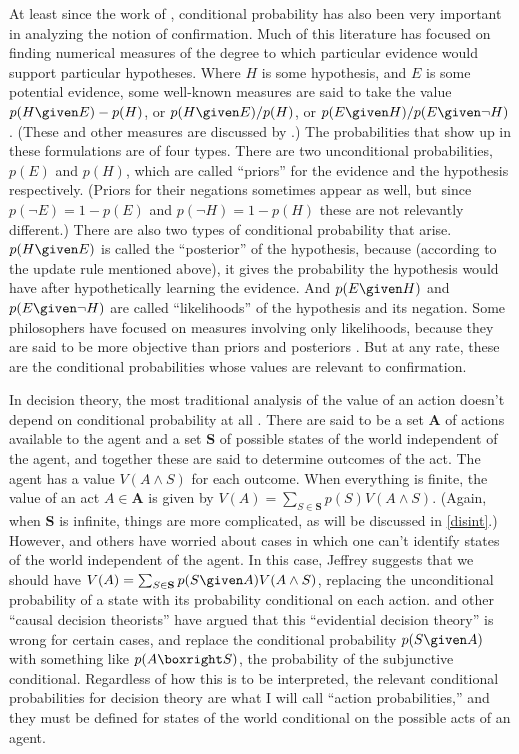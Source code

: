 At least since the work of \citet{jhl}, conditional probability has also been very important in analyzing the notion of confirmation. Much of this literature has focused on finding numerical measures of the degree to which particular evidence would support particular hypotheses. Where $H$ is some hypothesis, and $E$ is some potential evidence, some well-known measures are said to take the value $p(H \given E)-p(H)$, or $p(H \given E)/p(H)$, or $p(E \given H)/p(E \given \lnot H)$. (These and other measures are discussed by \citet{meassens}.) The probabilities that show up in these formulations are of four types. There are two unconditional probabilities, $p(E)$ and $p(H)$, which are called ``priors'' for the evidence and the hypothesis respectively. (Priors for their negations sometimes appear as well, but since $p(\lnot E)=1-p(E)$ and $p(\lnot H)=1-p(H)$ these are not relevantly different.) There are also two types of conditional probability that arise. $p(H \given E)$ is called the ``posterior'' of the hypothesis, because (according to the update rule mentioned above), it gives the probability the hypothesis would have after hypothetically learning the evidence. And $p(E \given H)$ and $p(E \given \lnot H)$ are called ``likelihoods'' of the hypothesis and its negation. Some philosophers have focused on measures involving only likelihoods, because they are said to be more objective than priors and posteriors \citep{royall}. But at any rate, these are the conditional probabilities whose values are relevant to confirmation.

In decision theory, the most traditional analysis of the value of an action doesn't depend on conditional probability at all \citep{savage}. There are said to be a set $\mathbf{A}$ of actions available to the agent and a set $\mathbf{S}$ of possible states of the world independent of the agent, and together these are said to determine outcomes of the act. The agent has a value $V(A\land S)$ for each outcome. When everything is finite, the value of an act $A\in\mathbf{A}$ is given by $V(A)=\sum_{S\in\mathbf{S}}p(S)V(A\land S)$. (Again, when $\mathbf{S}$ is infinite, things are more complicated, as will be discussed in \autoref{disint}.) However, \citet{jeffrey} and others have worried about cases in which one can't identify states of the world independent of the agent. In this case, Jeffrey suggests that we should have $V(A)=\sum_{S\in\mathbf{S}}p(S \given A)V(A\land S)$, replacing the unconditional probability of a state with its probability conditional on each action. \citet{joyce} and other ``causal decision theorists'' have argued that this ``evidential decision theory'' is wrong for certain cases, and replace the conditional probability $p(S \given A)$ with something like $p(A\boxright S)$, the probability of the subjunctive conditional. Regardless of how this is to be interpreted, the relevant conditional probabilities for decision theory are what I will call ``action probabilities,'' and they must be defined for states of the world conditional on the possible acts of an agent.

